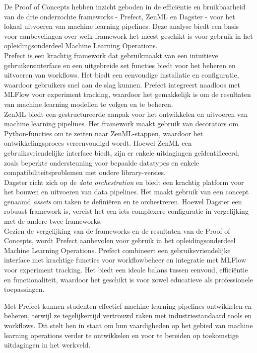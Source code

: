 De Proof of Concepts hebben inzicht geboden in de efficiëntie en bruikbaarheid van de drie onderzochte frameworks - Prefect, ZenML en Dagster - voor het lokaal uitvoeren van machine learning pipelines. Deze analyse biedt een basis voor aanbevelingen over welk framework het meest geschikt is voor gebruik in het opleidingsonderdeel Machine Learning Operations.\\

Prefect is een krachtig framework dat gebruikmaakt van een intuïtieve gebruikersinterface en een uitgebreide set functies biedt voor het beheren en uitvoeren van workflows. Het biedt een eenvoudige installatie en configuratie, waardoor gebruikers snel aan de slag kunnen. Prefect integreert naadloos met MLFlow voor experiment tracking, waardoor het gemakkelijk is om de resultaten van machine learning modellen te volgen en te beheren.\\

ZenML biedt een gestructureerde aanpak voor het ontwikkelen en uitvoeren van machine learning pipelines. Het framework maakt gebruik van decorators om Python-functies om te zetten naar ZenML-stappen, waardoor het ontwikkelingsproces vereenvoudigd wordt. Hoewel ZenML een gebruiksvriendelijke interface biedt, zijn er enkele uitdagingen geïdentificeerd, zoals beperkte ondersteuning voor bepaalde datatypes en enkele compatibiliteitsproblemen met oudere library-versies.\\

Dagster richt zich op de \textit{data orchestration} en biedt een krachtig platform voor het bouwen en uitvoeren van data pipelines. Het maakt gebruik van een concept genaamd \textit{assets} om taken te definiëren en te orchestreren. Hoewel Dagster een robuust framework is, vereist het een iets complexere configuratie in vergelijking met de andere twee frameworks.\\

Gezien de vergelijking van de frameworks en de resultaten van de Proof of Concepts, wordt Prefect aanbevolen voor gebruik in het opleidingsonderdeel Machine Learning Operations. Prefect combineert een gebruiksvriendelijke interface met krachtige functies voor workflowbeheer en integratie met MLFlow voor experiment tracking. Het biedt een ideale balans tussen eenvoud, efficiëntie en functionaliteit, waardoor het geschikt is voor zowel educatieve als professionele toepassingen.

Met Prefect kunnen studenten effectief machine learning pipelines ontwikkelen en beheren, terwijl ze tegelijkertijd vertrouwd raken met industriestandaard tools en workflows. Dit stelt hen in staat om hun vaardigheden op het gebied van machine learning operations verder te ontwikkelen en voor te bereiden op toekomstige uitdagingen in het werkveld.


